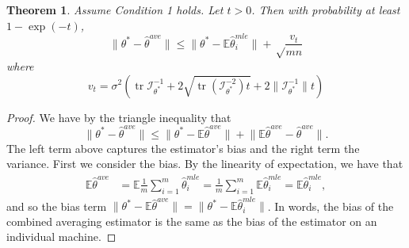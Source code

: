 \documentclass[twoside]{article}
\newtheorem{theorem}{Theorem}
\DeclareMathOperator*{\tr}{tr}
\newcommand{\E}{\mathbb{E}}
\newcommand{\w}{\theta}
\newcommand{\wave}{\hat\w^{ave}}
\newcommand{\wmle}{\hat\w^{mle}}
\newcommand{\wstar}{{\w^{*}}}
\newcommand{\I}{\mathcal I}
\newcommand{\ltwo}[1]{{\lVert {#1} \rVert}}
\begin{document}
\begin{theorem}
\label{thm:wave}
Assume Condition 1 holds.
Let $t>0$.
Then with probability at least $1-\exp(-t)$,
\begin{equation}
\ltwo{\wstar-\wave} \le \ltwo{\wstar-\E\wmle_i} + \sqrt\frac{v_t}{mn}
\end{equation}
where
\begin{equation}
v_t =
\sigma^2
\left(
\tr{\I^{-1}_{\wstar}}
+ 2\sqrt{\tr \left({\I^{-2}_{\wstar}}\right)t}
+ 2\ltwo{\I^{-1}_{\wstar}}t
\right)
\label{eq:vt}
\end{equation}
\end{theorem}

\begin{proof}
We have by the triangle inequality that
\begin{equation}
\ltwo{\wstar-\wave} \le \ltwo{\wstar-\E\wave} + \ltwo{\E\wave-\wave}
.
\label{eq:biasvar}
\end{equation}
The left term above captures the estimator's bias and the right term the variance.
First we consider the bias.
By the linearity of expectation, we have that
\begin{align}
\E\wave
&=
\E\frac{1}{m}\sum_{i=1}^m\wmle_i
=
\frac{1}{m}\sum_{i=1}^m\E\wmle_i
=
\E\wmle_i
,
\label{eq:expwave}
\end{align}
and so the bias term
$\ltwo{\wstar-\E\wave}
=
\ltwo{\wstar-\E\wmle_i}
$.
In words, the bias of the combined averaging estimator is the same as the bias of the estimator on an individual machine.


\end{proof}
\end{document}
